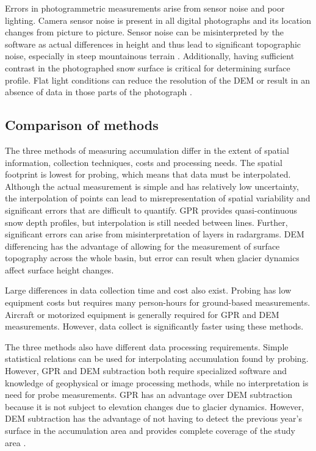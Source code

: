 \documentclass{sfuthesis}
\begin{document}
\begin{appendices}
Errors in photogrammetric measurements arise from sensor noise and poor lighting. Camera sensor noise is present in all digital photographs and its location changes from picture to picture. Sensor noise can be misinterpreted by the software as actual differences in height and thus lead to significant topographic noise, especially in steep mountainous terrain \citep{Nolan2015}. Additionally, having sufficient contrast in the photographed snow surface is critical for determining surface profile. Flat light conditions can reduce the resolution of the DEM or result in an absence of data in those parts of the photograph \citep{Nolan2015}. 

\subsection{Comparison of methods}
\label{sec:comparemethods}
The three methods of measuring accumulation differ in the extent of spatial information, collection techniques, costs and processing needs. The spatial footprint is lowest for probing, which means that data must be interpolated. Although the actual measurement is simple and has relatively low uncertainty, the interpolation of points can lead to misrepresentation of spatial variability and significant errors that are difficult to quantify. GPR provides quasi-continuous snow depth profiles, but interpolation is still needed between lines. Further, significant errors can arise from misinterpretation of layers in radargrams. DEM differencing has the advantage of allowing for the measurement of surface topography across the whole basin, but error can result when glacier dynamics affect surface height changes. 

Large differences in data collection time and cost also exist. Probing has low equipment costs but requires many person-hours for ground-based measurements. Aircraft or motorized equipment is generally required for GPR and DEM measurements. However, data collect is significantly faster using these methods.  

The three methods also have different data processing requirements. Simple statistical relations can be used for interpolating accumulation found by probing. However, GPR and DEM subtraction both require specialized software and knowledge of geophysical or image processing methods, while no interpretation is need for probe measurements. GPR has an advantage over DEM subtraction because it is not subject to elevation changes due to glacier dynamics. However, DEM subtraction has the advantage of not having to detect the previous year's surface in the accumulation area and provides complete coverage of the study area \citep{Sold2013}. 


\end{appendices}
\end{document}
